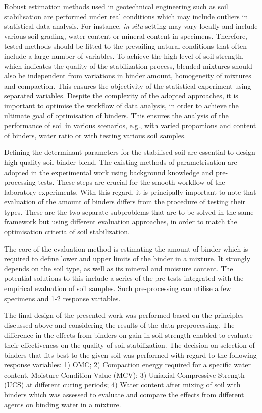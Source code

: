 \documentclass[eprint,
]{actapoly}
\begin{document}
Robust estimation methods used in geotechnical engineering such as soil stabilisation are performed under real conditions which may include outliers in statistical data analysis. For instance, \emph{in-situ} setting may vary locally and include various soil grading, water content or mineral content in specimens. Therefore, tested methods should be fitted to the prevailing natural conditions that often include a large number of variables. To achieve the high level of soil strength, which indicates the quality of the stabilization process, blended mixtures should also be independent from variations in binder amount, homogeneity of mixtures and compaction. This ensures the objectivity of the statistical experiment using separated variables. Despite the complexity of the adopted approaches, it is important to optimise the workflow of data analysis, in order to achieve the ultimate goal of optimisation of binders. This ensures the analysis of the performance of soil in various scenarios, e.g., with varied proportions and content of binders, water ratio or with testing various soil samples.

Defining the determinant parameters for the stabilised soil are essential to design high-quality soil-binder blend. The existing methods of parametrisation are adopted in the experimental work using background knowledge and pre-processing tests. These steps are crucial for the smooth workflow of the laboratory experiments. With this regard, it is principally important to note that evaluation of the amount of binders differs from the procedure of testing their types. These are the two separate subproblems that are to be solved in the same framework but using different evaluation approaches, in order to match the optimisation criteria of soil stabilization. 

The core of the evaluation method is estimating the amount of binder which is required to define lower and upper limits of the binder in a mixture. It strongly depends on the soil type, as well as its mineral and moisture content. The potential solutions to this include a series of the pre-tests integrated with the empirical evaluation of soil samples. Such pre-processing can utilise a few specimens and 1-2 response variables. 

The final design of the presented work was performed based on the principles discussed above and considering the results of the data preprocessing. The difference in the effects from binders on gain in soil strength enabled to evaluate their effectiveness on the quality of soil stabilization. The decision on selection of binders that fits best to the given soil was performed with regard to the following response variables: 1) OMC; 2) Compaction energy required for a specific water content, Moisture Condition Value (MCV); 3) Uniaxial Compressive Strength (UCS) at different curing periods; 4) Water content after mixing of soil with binders which was assessed to evaluate and compare the effects from different agents on binding water in a mixture.
\end{document}
